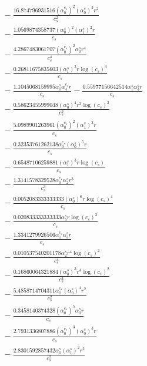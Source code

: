 \documentclass[10pt]{article}
\begin{document}
\begin{align*}
&{}  - \frac{16.874796931516 \left(\alpha_{0}^{c_s}\right)^{2} \left(\alpha_{0}^s\right)^{3} r^{2}}{c_{s}^{2}} \\
&{}  - \frac{1.0569874358737 \left(\alpha_{0}^s\right)^{2} \left(\alpha_{1}^s\right)^{2} r}{c_{s}} \\
&{}  - \frac{4.2867483061707 \left(\alpha_{0}^{c_s}\right)^{2} \alpha_{0}^s r^{4}}{c_{s}^{4}} \\
&{}  - \frac{0.26811675835603 \left(\alpha_{1}^s\right)^{3} r \log{\left(c_{s} \right)}^{3}}{c_{s}} \\
&{}  - \frac{1.1045068159995 \alpha_{0}^s \alpha_{4}^{c_s} r}{c_{s}} - \frac{0.55977156642514 \alpha_{1}^s \alpha_{3}^s r}{c_{s}} \\
&{}  - \frac{0.58623455999048 \left(\alpha_{0}^s\right)^{4} r^{3} \log{\left(c_{s} \right)}^{2}}{c_{s}^{3}} \\
&{}  - \frac{5.0989901263961 \left(\alpha_{0}^{c_s}\right)^{2} \left(\alpha_{1}^s\right)^{2} r}{c_{s}} \\
&{}  - \frac{0.32353761262138 \alpha_{0}^{c_s} \left(\alpha_{0}^s\right)^{5} r}{c_{s}} \\
&{}  - \frac{0.65487106259881 \left(\alpha_{1}^s\right)^{3} r \log{\left(c_{s} \right)}}{c_{s}} \\
&{}  - \frac{1.3141578329528 \alpha_{0}^{c_s} \alpha_{2}^s r^{3}}{c_{s}^{3}} \\
&{}  - \frac{0.0052083333333333 \left(\alpha_{0}^s\right)^{6} r \log{\left(c_{s} \right)}^{4}}{c_{s}} \\
&{}  - \frac{0.020833333333333 \alpha_{5}^s r \log{\left(c_{s} \right)}^{3}}{c_{s}} \\
&{}  - \frac{1.3341279926506 \alpha_{1}^{c_s} \alpha_{3}^s r}{c_{s}} \\
&{}  - \frac{0.010537540201178 \alpha_{2}^s r^{4} \log{\left(c_{s} \right)}^{2}}{c_{s}^{4}} \\
&{}  - \frac{0.16860064321884 \left(\alpha_{0}^s\right)^{3} r^{4} \log{\left(c_{s} \right)}^{2}}{c_{s}^{4}} \\
&{}  - \frac{5.4858714704311 \alpha_{0}^{c_s} \left(\alpha_{0}^s\right)^{4} r^{2}}{c_{s}^{2}} \\
&{}  - \frac{0.3458140374328 \left(\alpha_{0}^{c_s}\right)^{5} \alpha_{0}^s r}{c_{s}} \\
&{}  - \frac{2.7931336807886 \left(\alpha_{0}^{c_s}\right)^{3} \left(\alpha_{0}^s\right)^{3} r}{c_{s}} \\
&{}  - \frac{2.8301592857432 \alpha_{0}^s \left(\alpha_{1}^s\right)^{2} r^{2}}{c_{s}^{2}} \\

\end{align*}
\end{document}
